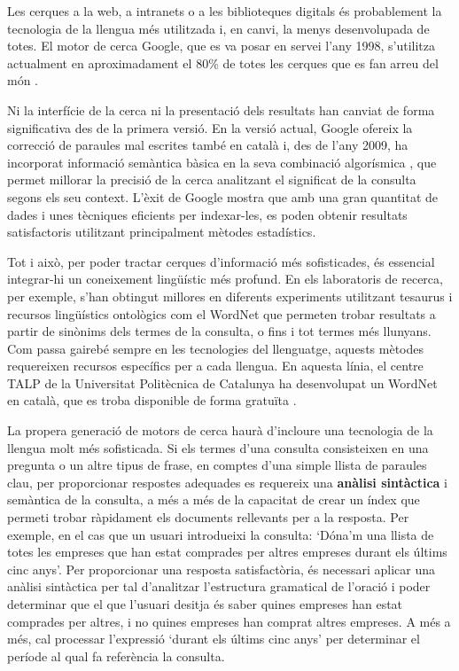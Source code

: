 \begin{multicols}{2}
Les cerques a la web, a intranets o a les biblioteques digitals és probablement la tecnologia de la llengua més utilitzada i, en canvi, la menys desenvolupada de totes. El motor de cerca Google, que es va posar en servei l’any 1998, s’utilitza actualment en aproximadament el 80\% de totes les cerques que es fan arreu del món \cite{CAT-Nota22}. 

Ni la interfície de la cerca ni la presentació dels resultats han canviat de forma significativa des de la primera versió. En la versió actual, Google ofereix la correcció de paraules mal escrites també en català i, des de l’any 2009, ha incorporat informació semàntica bàsica en la seva combinació algorísmica \cite{CAT-Nota23}, que permet millorar la precisió de la cerca analitzant el significat de la consulta segons els seu context. L’èxit de Google mostra que amb una gran quantitat de dades i unes tècniques eficients per indexar-les, es poden obtenir resultats satisfactoris utilitzant principalment mètodes estadístics.

Tot i això, per poder tractar cerques d’informació més sofisticades, és essencial integrar-hi un coneixement lingüístic més profund. En els laboratoris de recerca, per exemple, s’han obtingut millores en diferents experiments utilitzant tesaurus i recursos lingüístics ontològics com el WordNet que permeten trobar resultats a partir de sinònims dels termes de la consulta, o fins i tot termes més llunyans. Com passa gairebé sempre en les tecnologies del llenguatge, aquests mètodes requereixen recursos específics per a cada llengua. En aquesta línia, el centre TALP de la Universitat Politècnica de Catalunya ha desenvolupat un WordNet en català, que es troba disponible de forma gratuïta \cite{CAT-Nota24}. 

La propera generació de motors de cerca haurà d’incloure una tecnologia de la llengua molt més sofisticada. Si els termes d’una consulta consisteixen en una pregunta o un altre tipus de frase, en comptes d’una simple llista de paraules clau, per proporcionar respostes adequades es requereix una \textbf{anàlisi sintàctica} i semàntica de la consulta, a més  a més de la capacitat de crear un índex que permeti trobar ràpidament els documents rellevants per a la resposta. Per exemple, en el cas que un usuari introdueixi la consulta: ‘Dóna’m una llista de totes les empreses que han estat comprades per altres empreses durant els últims cinc anys’. Per proporcionar una resposta satisfactòria, és necessari aplicar una anàlisi sintàctica per tal d’analitzar l’estructura gramatical de l’oració i poder determinar que el que l’usuari desitja és saber quines empreses han estat comprades per altres, i no quines empreses han comprat altres empreses. A més a més, cal processar  l’expressió ‘durant els últims cinc anys’ per determinar el període al qual fa referència la consulta. 


\end{multicols}
